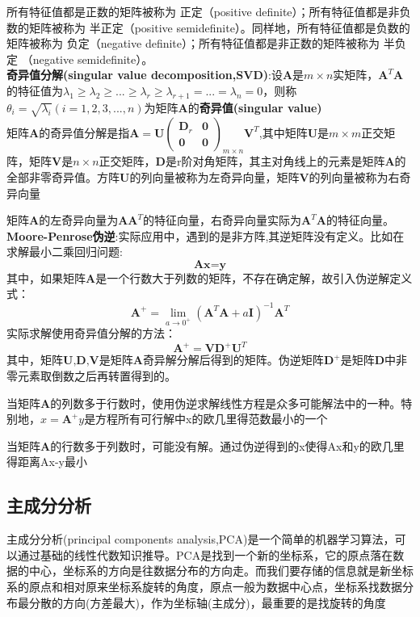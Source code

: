 \documentclass[openbib]{article}
\begin{document}
所有特征值都是正数的矩阵被称为 正定（positive definite）；所有特征值都是非负数的矩阵被称为 半正定（positive semidefinite）。同样地，所有特征值都是负数的矩阵被称为 负定（negative definite）；所有特征值都是非正数的矩阵被称为 半负定
（negative semidefinite）。
\\\textbf{奇异值分解(singular value decomposition,SVD)}:设$\textbf{A}$是$m\times n$实矩阵，$\textbf{A}^{T}\textbf{A}$的特征值为$\lambda_1\ge\lambda_2\ge...\ge\lambda_r\ge\lambda_{r+1}=...=\lambda_n=0$，则称$\theta_i=\sqrt{\lambda_i}(i=1,2,3,...,n)$为矩阵\textbf{A}的\textbf{奇异值(singular value)}
\\矩阵\textbf{A}的奇异值分解是指$\textbf{A}=\textbf{U}\begin{pmatrix}
	\textbf{D}_r & \textbf{0} \\
	\textbf{0} & \textbf{0}
\end{pmatrix}_{m\times n}\textbf{V}^T$,其中矩阵\textbf{U}是$m\times m$正交矩阵，矩阵\textbf{V}是$n\times n$正交矩阵，\textbf{D}是r阶对角矩阵，其主对角线上的元素是矩阵\textbf{A}的全部非零奇异值。方阵\textbf{U}的列向量被称为左奇异向量，矩阵\textbf{V}的列向量被称为右奇异向量

矩阵\textbf{A}的左奇异向量为$\textbf{A}\textbf{A}^{T}$的特征向量，右奇异向量实际为$\textbf{A}^{T}\textbf{A}$的特征向量。
\\\textbf{Moore-Penrose伪逆}:实际应用中，遇到的是非方阵,其逆矩阵没有定义。比如在求解最小二乘回归问题:$$\textbf{Ax}=\textbf{y}$$其中，如果矩阵\textbf{A}是一个行数大于列数的矩阵，不存在确定解，故引入伪逆解定义式：$$\textbf{A}^+=\lim_{a \to 0^+} (\textbf{A}^T\textbf{A}+a\textbf{I})^{-1}\textbf{A}^T$$
实际求解使用奇异值分解的方法：$$\textbf{A}^+=\textbf{VD}^+\textbf{U}^T$$
其中，矩阵$\textbf{U,D,V}$是矩阵$\textbf{A}$奇异解分解后得到的矩阵。伪逆矩阵$\textbf{D}^+$是矩阵\textbf{D}中非零元素取倒数之后再转置得到的。

当矩阵$\textbf{A}$的列数多于行数时，使用伪逆求解线性方程是众多可能解法中的一种。特别地，$x=\textbf{A}^+y$是方程所有可行解中x的欧几里得范数最小的一个

当矩阵$\textbf{A}$的行数多于列数时，可能没有解。通过伪逆得到的x使得Ax和y的欧几里得距离Ax-y最小
\subsection{主成分分析}
主成分分析(principal components analysis,PCA)是一个简单的机器学习算法，可以通过基础的线性代数知识推导。PCA是找到一个新的坐标系，它的原点落在数据的中心，坐标系的方向是往数据分布的方向走。而我们要存储的信息就是新坐标系的原点和相对原来坐标系旋转的角度，原点一般为数据中心点，坐标系找数据分布最分散的方向(方差最大)，作为坐标轴(主成分)，最重要的是找旋转的角度
\end{document}

